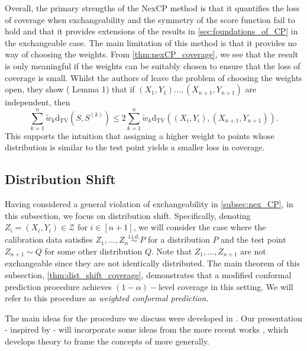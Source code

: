 \documentclass[11pt, titlepage]{article} %
\newcommand{\R}{\mathrm}
\numberwithin{equation}{section}
\theoremstyle{definition}
\numberwithin{theorem}{section}
\numberwithin{lemma}{section}
\numberwithin{corollary}{section}
\numberwithin{proposition}{section}
\numberwithin{definition}{section}
\numberwithin{remark}{section}
\begin{document}
\noindent
Overall, the primary strengths of the NexCP method is that it quantifies the loss of coverage when exchangeability and the symmetry of the score function fail to hold and that it provides extensions of the results in \cref{sec:foundations_of_CP} in the exchangeable case. The main limitation of this method is that it provides no way of choosing the weights. From \cref{thm:nexCP_coverage}, we see that the result is only meaningful if the weights can be suitably chosen to ensure that the loss of coverage is small. Whilst the authors of \cite{barber2023conformalbeyondexch} leave the problem of choosing the weights open, they show (\cite{barber2023conformalbeyondexch} Lemma 1) that if \((X_1,Y_1) \ldots, (X_{n+1}, Y_{n+1})\) are independent, then \[\sum_{k=1}^{n} \tilde{w}_k \R{d_{TV}}(S, S^{(k)}) \leq 2 \sum_{k=1}^{n} \tilde{w}_k \R{d_{TV}}((X_i, Y_i), (X_{n+1}, Y_{n+1})).\] This supports the intuition that assigning a higher weight to points whose distribution is similar to the test point yields a smaller loss in coverage.

\subsection{Distribution Shift}
\label{subsec:dist_shift}

Having considered a general violation of exchangeability in \cref{subsec:nex_CP}, in this subsection, we focus on distribution shift. Specifically, denoting \(Z_i = (X_i, Y_i) \in \mathcal{Z}\) for \(i \in [n+1]\), we will consider the case where the calibration data satisfies \(Z_1, \ldots, Z_n \overset{\R{i.i.d.}}{\sim} P\) for a distribution \(P\) and the test point \(Z_{n+1} \sim Q\) for some other distribution \(Q\). Note that \(Z_1, \ldots, Z_{n+1}\) are not exchangeable since they are not identically distributed. The main theorem of this subsection, \cref{thm:dist_shift_coverage}, demonstrates that a modified conformal prediction procedure achieves \((1-\alpha)-\)level coverage in this setting. We will refer to this procedure as \textit{weighted conformal prediction}. \vskip5pt

\noindent
The main ideas for the procedure we discuss were developed in \cite{tibshirani2019covariateshift, ramdas2021labelshift}. Our presentation - inspired by \cite{angelopoulos2024theoreticalfoundationsconformalprediction} - will incorporate some ideas from the more recent works \cite{barber2024finetti,tang2023finiteweighted}, which develops theory to frame the concepts of \cite{tibshirani2019covariateshift,ramdas2021labelshift} more generally. \vskip5pt
\end{document}
